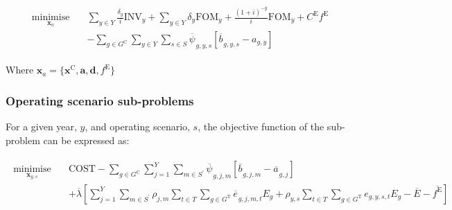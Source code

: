 \documentclass{article}
\newcommand{\sGeneratorsCandidate}{G^{\mathrm{C}}}
\newcommand{\sGeneratorsThermal}{G^{\mathrm{T}}}
\newcommand{\sYears}{Y}
\newcommand{\sScenarios}{S}
\newcommand{\sIntervals}{T}
\newcommand{\iGenerator}{g}
\newcommand{\iYear}{y}
\newcommand{\iYearTerminal}{\overline{\iYear}}
\newcommand{\iYearAlias}{j}
\newcommand{\iScenario}{s}
\newcommand{\iScenarioAlias}{m}
\newcommand{\iInterval}{t}
\newcommand{\cFixedOperationsMaintenanceCost}[1][\iYear]{\mathrm{FOM}_{#1}}
\newcommand{\cScenarioDuration}[1][\iYear,\iScenario]{\rho_{#1}}
\newcommand{\cEmissionsIntensity}[1][\iGenerator]{E_{#1}}
\newcommand{\cInvestmentCost}[1][\iYear]{\mathrm{INV}_{#1}}
\newcommand{\cInterestRate}{i}
\newcommand{\cEmmissionsCumulativeTarget}{\overline{E}}
\newcommand{\cEmissionsTargetViolationPenalty}{C^{\mathrm{E}}}
\newcommand{\cObjectiveFunction}{\mathrm{COST}}
\newcommand{\cDiscountRate}[1][\iYear]{\delta_{#1}}
\newcommand{\vEnergy}[1][\iGenerator,\iYear,\iScenario,\iInterval]{e_{#1}}
\newcommand{\vEmissionsTargetViolation}{f^{\mathrm{E}}}
\newcommand{\vInstalledCapacityTotal}[1][\iGenerator,\iYear]{a_{#1}}
\newcommand{\vInstalledCapacityTotalScenario}[1][\iGenerator,\iYear,\iScenario]{b_{#1}}
\newcommand{\vFixedCapacityDual}[1][\iGenerator,\iYear,\iScenario]{\psi_{#1}}
\DeclareMathOperator*{\minimise}{minimise}
\begin{document}
\begin{align}
	\begin{split}
		\minimise\limits_{\bm{x}_{a}} \quad & \sum\limits_{\iYear \in \sYears} \frac{\cDiscountRate}{\cInterestRate}\cInvestmentCost + \sum\limits_{\iYear \in \sYears} \cDiscountRate \cFixedOperationsMaintenanceCost  + \frac{(1+\cInterestRate)^{-\iYearTerminal}}{\cInterestRate} \cFixedOperationsMaintenanceCost[\iYearTerminal] + \cEmissionsTargetViolationPenalty \vEmissionsTargetViolation\\
		& - \sum\limits_{\iGenerator \in \sGeneratorsCandidate}\sum\limits_{\iYear \in \sYears}\sum\limits_{\iScenario \in \sScenarios} \overline{\vFixedCapacityDual[]}_{\iGenerator,\iYear,\iScenario}\left[\overline{\vInstalledCapacityTotalScenario[]}_{\iGenerator,\iYear,\iScenario} - \vInstalledCapacityTotal\right]
	\end{split}
\end{align}

Where $\bm{x}_{a} = \{\bm{x}^{\mathrm{C}}, \bm{a}, \bm{d}, \vEmissionsTargetViolation\}$

\subsubsection{Operating scenario sub-problems}
For a given year, $\iYear$, and operating scenario, $\iScenario$, the objective function of the sub-problem can be expressed as:

\begin{align}
	\begin{split}
		\minimise\limits_{\bm{x}_{\iYear,\iScenario}} \quad &\cObjectiveFunction - \sum\limits_{\iGenerator \in \sGeneratorsCandidate}\sum\limits_{\iYearAlias=1}^{\sYears}\sum\limits_{\iScenarioAlias \in \sScenarios^{\prime}} \overline{\vFixedCapacityDual[]}_{\iGenerator,\iYearAlias,\iScenarioAlias}\left[\overline{\vInstalledCapacityTotalScenario[]}_{\iGenerator,\iYearAlias,\iScenarioAlias} - \overline{\vInstalledCapacityTotal[]}_{\iGenerator,\iYearAlias}\right]\\
		& + \overline{\lambda} \left[\sum\limits_{\iYearAlias=1}^{\sYears} \sum\limits_{\iScenarioAlias \in \sScenarios^{\prime}} \cScenarioDuration[\iYearAlias,\iScenarioAlias] \sum\limits_{\iInterval \in \sIntervals} \sum\limits_{\iGenerator \in \sGeneratorsThermal} \overline{\vEnergy[]}_{\iGenerator,\iYearAlias,\iScenarioAlias,\iInterval} \cEmissionsIntensity + \cScenarioDuration\sum\limits_{\iInterval \in \sIntervals}\sum\limits_{\iGenerator \in \sGeneratorsThermal} \vEnergy[\iGenerator,\iYear,\iScenario,\iInterval] \cEmissionsIntensity - \cEmmissionsCumulativeTarget - \overline{\vEmissionsTargetViolation}\right]\\
	\end{split}
\end{align}
\end{document}
